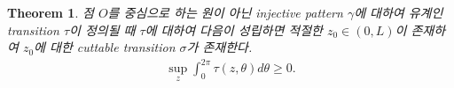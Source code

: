 \documentclass{amsart}
\theoremstyle{plain}
\newtheorem{theorem}{Theorem}[section]
\theoremstyle{definition}
\theoremstyle{remark}
\begin{document}
\iffalse
(정리)커터블 충분조건 : 상수가 아니고 세타에 무관하게 제트에 대해 전구간 강증가하는 트랜지션 정의되면 커터블 트랜지션 존재
증명 : 


트랜지션의 성질 앞의 다섯가지

정리에 의해 나오는 트랜지션 성질-커터블 : 타우
 사인드 트랜지션
 심플 트랜지션
 트랜지션 적분




결론정리 : 원이 아닌 패턴이 커터블일 필요충분조건은 유계 트랜지션이 정의되는 것, 즉 필요조건1,2이다

리마크 : 폴딩에서 페네트레이션 규칙을 유지하며 단사조건을 배제하면 원도 커터블
\fi
\begin{theorem}\label{35}%
점 $O$를 중심으로 하는 원이 아닌 injective pattern $\gamma$에 대하여 유계인 transition $\tau$이 정의될 때 $\tau$에 대하여 다음이 성립하면 적절한 $z_0\in(0,L)$이 존재하여 $z_0$에 대한 cuttable transition $\sigma$가 존재한다.
\begin{align*}
\sup_z\int_0^{2\pi}\tau(z,\theta)d\theta\ge0.
\end{align*}
\end{theorem}
\end{document}
